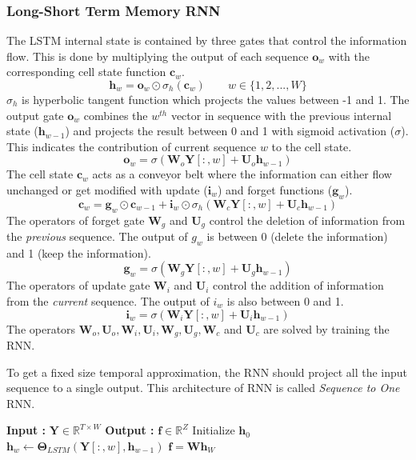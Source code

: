\subsubsection{Long-Short Term Memory RNN}
The LSTM internal state is contained by three gates that control the information flow. This is done by multiplying the output of each sequence $\textbf{o}_{w}$ with the corresponding cell state function $\textbf{c}_{w}$.
\[
\textbf{h}_{w} = \textbf{o}_{w} \odot \sigma_{h}(\textbf{c}_{w}) \qquad w \in \{1,2,...,W\}
\] 
$\sigma_{h}$ is hyperbolic tangent function which projects the values between -1 and 1. The output gate $\textbf{o}_{w}$ combines the $w^{th}$ vector in sequence with the previous internal state ($\textbf{h}_{w-1}$) and projects the result between 0 and 1 with sigmoid activation ($\sigma$). This indicates the contribution of current sequence $w$ to the cell state. 
\[
\textbf{o}_{w} = \sigma(\textbf{W}_{o}\textbf{Y}[:,w] + \textbf{U}_{o}\textbf{h}_{w-1})
\]
The cell state $\textbf{c}_{w}$ acts as a conveyor belt where the information can either flow unchanged or get modified with update ($\textbf{i}_{w}$) and forget functions ($\textbf{g}_{w}$).
\[
\textbf{c}_{w} = \textbf{g}_{w} \odot \textbf{c}_{w-1} + \textbf{i}_{w} \odot \sigma_{h}(\textbf{W}_{c}\textbf{Y}[:,w] + \textbf{U}_{c}\textbf{h}_{w-1})
\] 
The operators of forget gate $\textbf{W}_{g}$ and $\textbf{U}_{g}$ control the deletion of information from the\textit{ previous} sequence. The output of $g_{w}$ is between 0 (delete the information) and 1 (keep the information). 
\[
\textbf{g}_{w} = \sigma(\textbf{W}_{g}\textbf{Y}[:,w] + \textbf{U}_{g}\textbf{h}_{w-1})
\] 
The operators of update gate $\textbf{W}_{i}$ and $\textbf{U}_{i}$ control the addition of information from the \textit{current} sequence. The output of $i_{w}$ is also between 0 and 1.
\[
\textbf{i}_{w} = \sigma(\textbf{W}_{i}\textbf{Y}[:,w] + \textbf{U}_{i}\textbf{h}_{w-1})
\] 
The operators $\textbf{W}_{o}, \textbf{U}_{o}, \textbf{W}_{i}, \textbf{U}_{i}, \textbf{W}_{g}, \textbf{U}_{g}, \textbf{W}_{c}$ and $ \textbf{U}_{c}$ are solved by training the RNN.
\bigskip

\noindent To get a fixed size temporal approximation, the RNN should project all the input sequence to a single output. This architecture of RNN is called \textit{Sequence to One} RNN. 
\begin{algorithm}
  \caption{$\textbf{f}$ = $Seq2One\_LSTM$($\textbf{Y}$) }\label{alg:s2olstm}
  \begin{algorithmic}[1]
    \Statex \textbf{Input :} $\textbf{Y} \in \mathbb{R}^{T \times W}$
    \Statex \textbf{Output :} $\textbf{f} \in \mathbb{R}^{Z}$
    \State Initialize $\textbf{h}_{0}$
    \State  $\textbf{h}_{w} \leftarrow \bm{\Theta}_{LSTM}(\textbf{Y}[:,w],\textbf{h}_{w-1})$
    \EndFor
    \State $\textbf{f} = \textbf{W}\textbf{h}_{W}$
  \end{algorithmic}
\end{algorithm}
\FloatBarrier

